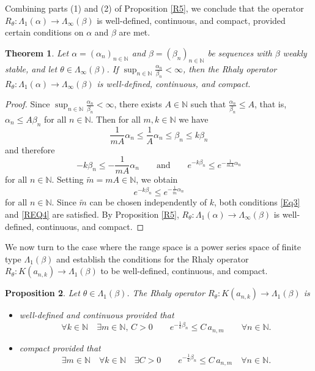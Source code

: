 \documentclass{birkjour}
\newtheorem{thm}{Theorem}[section]
\newtheorem{prop}[thm]{Proposition}
\theoremstyle{definition}
\theoremstyle{remark}
\numberwithin{equation}{section}
\begin{document}
Combining parts (1) and (2) of Proposition \ref{R5}, we conclude that the operator  $R_{\theta}:\Lambda_{1}(\alpha)\to \Lambda_{\infty}(\beta)$  is well-defined, continuous, and compact, provided certain conditions on $\alpha$ and $\beta$ are met.

\begin{thm}
Let $\alpha=(\alpha_n)_{n\in\mathbb{N}}$ and $\beta=(\beta_{n})_{n\in \mathbb{N}}$ 
be sequences with $\beta$ weakly stable, and let $\theta\in \Lambda_{\infty}(\beta)$. 
If $\displaystyle\sup_{n\in\mathbb{N}}\frac{\alpha_n}{\beta_n}<\infty$, then 
the Rhaly operator $R_{\theta}:\Lambda_{1}(\alpha)\to \Lambda_{\infty}(\beta)$ 
is well-defined, continuous, and compact.
\end{thm}
\begin{proof} Since $\displaystyle \sup_{n\in\mathbb{N}}\frac{\alpha_n}{\beta_n}<\infty$, there exists 
$A\in \mathbb{N}$ such that $\displaystyle \frac{\alpha_n}{\beta_n}\leq A$, that is, 
$\alpha_{n}\leq A\beta_{n}$ for all $n\in \mathbb{N}$.
Then for all $m,k\in \mathbb{N}$ we have
$$ \frac{1}{mA}\alpha_{n}\leq \frac{1}{A}\alpha_{n}\leq \beta_{n}\leq k\beta_{n}$$
and therefore 
$$-k\beta_{n}\leq -\frac{1}{mA}\alpha_{n} \qquad \text{and} \qquad e^{-k\beta_{n}}\leq e^{-\frac{1}{mA}\alpha_{n}}$$
for all $n\in \mathbb{N}$.
Setting $\tilde{m}=mA\in\mathbb{N}$, we obtain
$$e^{-k\beta_n}\leq e^{-\frac{1}{\tilde{m}}\alpha_{n}}$$
for all $n\in\mathbb{N}$. Since $\tilde{m}$ can be chosen 
independently of $k$, both conditions \eqref{Eq3} and \eqref{REQ4} 
are satisfied. By Proposition \ref{R5}, $R_{\theta}:\Lambda_{1}(\alpha)
\to \Lambda_{\infty}(\beta)$ is well-defined, continuous, and compact.
\end{proof}

We now turn to the case where the range space is a power series space of 
finite type $\Lambda_1(\beta)$ and establish the conditions for the Rhaly operator $R_\theta: K(a_{n,k}) \to \Lambda_1(\beta)$ 
to be well-defined, continuous, and compact.

\begin{prop}
\label{R2b}
Let $\theta\in \Lambda_{1}(\beta)$.  The Rhaly operator $R_{\theta}:K(a_{n,k})\to \Lambda_{1}(\beta)$ is
\begin{itemize}
\item[1.]
 well-defined and continuous provided that 
\begin{equation}\label{REQ3a}
\forall k\in \mathbb{N} \quad \exists m\in \mathbb{N},\, C>0  \qquad 
e^{-\frac{1}{k}\beta_{n}}\leq C\, a_{n,m} \qquad \forall n\in \mathbb{N}.
\end{equation}
\item[2.] compact provided that
\begin{equation}\label{REQ4a}
\exists m\in \mathbb{N} \quad \forall k\in \mathbb{N} \quad \exists C>0  \qquad 
e^{-\frac{1}{k}\beta_{n}}\leq C\, a_{n,m} \quad \forall n\in \mathbb{N}.
\end{equation}
\end{itemize}
\end{prop}
\end{document}
